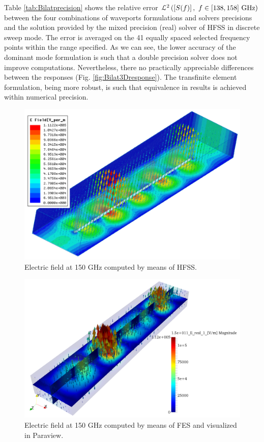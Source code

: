 Table \ref{tab:Bilatprecision} shows the relative error $\mathcal{L}^2\left(\left[S(f)\right], \ f\in [138,158]~\mathrm{GHz}\right)$ between the four combinations of waveports formulations and solvers precisions and the solution provided by the mixed precision (real) solver of HFSS in discrete sweep mode. The error is averaged on the 41 equally spaced selected frequency points within the range specified. As we can see, the lower accuracy of the dominant mode formulation is such that a double precision solver does not improve computations. Nevertheless, there no practically appreciable differences between the responses (Fig. \ref{fig:Bilat3Dresponse}). The transfinite element formulation, being more robust, is such that equivalence in results is achieved within numerical precision.


\begin{figure}[h!]
\centering
\includegraphics[width=14.4cm]{Bilat3DHFSS}
\caption{Electric field at 150 GHz computed by means of HFSS.}
\label{fig:Bilat3DHFSS}
\end{figure}

\begin{figure}[h!]
\centering
\includegraphics[width=15.4cm]{Bilat3D}
\caption{Electric field at 150 GHz computed by means of FES and visualized in Paraview.}
\label{fig:Bilat3D}
\end{figure}

